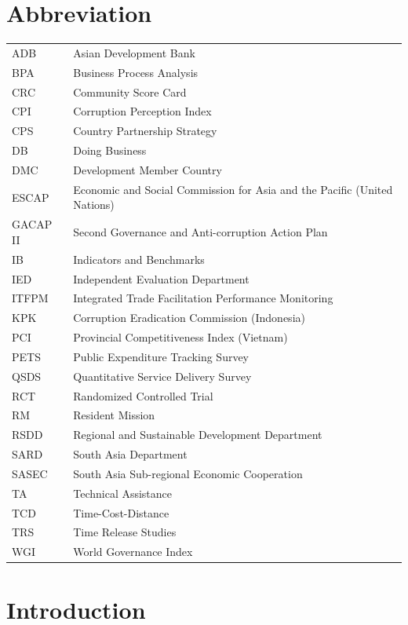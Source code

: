 \documentclass[12pt]{article}
\begin{document}
\section*{Abbreviation}
\begin{tabular}{ll}
ADB & Asian Development Bank \\
BPA & Business Process Analysis \\
CRC & Community Score Card \\
CPI & Corruption Perception Index \\
CPS & Country Partnership Strategy \\
DB & Doing Business \\
DMC & Development Member Country \\
ESCAP & Economic and Social Commission for Asia and the Pacific (United Nations) \\
GACAP II & Second Governance and Anti-corruption Action Plan \\
IB & Indicators and Benchmarks \\
IED & Independent Evaluation Department \\
ITFPM & Integrated Trade Facilitation Performance Monitoring \\
KPK & Corruption Eradication Commission (Indonesia) \\
PCI & Provincial Competitiveness Index (Vietnam)  \\
PETS & Public Expenditure Tracking Survey \\
QSDS & Quantitative Service Delivery Survey \\
RCT & Randomized Controlled Trial \\
RM & Resident Mission \\
RSDD &  Regional and Sustainable Development Department \\
SARD & South Asia Department \\
SASEC & South Asia Sub-regional Economic Cooperation \\
TA & Technical Assistance \\
TCD & Time-Cost-Distance \\
TRS & Time Release Studies \\
WGI & World Governance Index \\
\end{tabular}

\newpage
\section{Introduction} \label{sec:intro}
\end{document}

